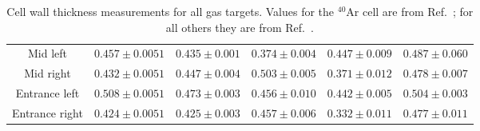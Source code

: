 \documentclass[review,numbers,sort&compress]{elsarticle}
\begin{document}
\begin{table}[!h]
\begin{adjustbox}{width=1\textwidth}
\begin{tabular}{cccccc}
Mid left             &        $0.457 \pm 0.0051$                                                  & $0.435 \pm 0.001$                                                     & $0.374 \pm 0.004$                                                     & $0.447 \pm 0.009$                                                     & $0.487 \pm 0.060$                                                      \\ 
Mid right             &        $0.432 \pm 0.0051$                                                  & $0.447 \pm 0.004$                                                     & $0.503 \pm 0.005$                                                     & $0.371 \pm 0.012$                                                     & $0.478 \pm 0.007$                                                    \\ 
Entrance left      &          $0.508 \pm 0.0051$                                                  & $0.473 \pm 0.003$                                                     & $0.456 \pm 0.010$                                                     & $0.442 \pm 0.005$                                                     & $0.504 \pm 0.003$                                                      \\ 
Entrance right     &		 $0.424 \pm 0.0051$                             & $0.425 \pm 0.003$                                & 
$0.457 \pm 0.006$                                & 
$0.332 \pm 0.011$                                & 
$0.477 \pm 0.011$                                 \\ \hline
\end{tabular}
\end{adjustbox}
	\caption{Cell wall thickness measurements for all gas targets. Values for the $^{40}$Ar cell are from  Ref.~\cite{ar_config}; for all 
    others they are from Ref.~\cite{cellconfig}.}
	\label{tab:cell}
\end{table}
\end{document}
